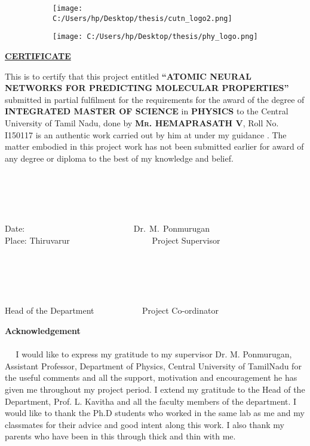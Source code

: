 \documentclass[11pt,a4paper]{report}
\begin{document}
\pagebreak
\begin{center}
	\begin{figure} [H]
		\begin{subfigure}{0.5\textwidth}
		\centering
		\texttt{[image: C:/Users/hp/Desktop/thesis/cutn\_logo2.png]}
		\end{subfigure}%
		\begin{subfigure}{0.8\textwidth}
		\centering
		\texttt{[image: C:/Users/hp/Desktop/thesis/phy\_logo.png]}
		\end{subfigure}
	\end{figure}

\underline {\scshape\bfseries\large CERTIFICATE}
\end{center}
\large {This is to certify that this project entitled {\bfseries \normalsize``ATOMIC NEURAL NETWORKS FOR PREDICTING MOLECULAR PROPERTIES''} submitted in partial fulfilment for the requirements for the award of the degree of {\normalsize\bfseries \scshape INTEGRATED MASTER OF  SCIENCE  } in {\normalsize\bfseries \scshape PHYSICS} to the Central University of Tamil Nadu, done by 
 {\normalsize\bfseries \scshape Mr. HEMAPRASATH V}, Roll No. I150117 is an authentic work carried out by him at  under my guidance . The matter embodied in this project work has not been submitted earlier for award of any degree or diploma to the best of my knowledge and belief.
 \\
 \\\\\\\\\\
 Date: $~~~~~~~~~~~~~~~~~~~~~~~~~~~~~~~~~~~~~~~~~~~~~~~~~~~~~~~~$ Dr.$~~$M.$~~$Ponmurugan
 \\
 Place: Thiruvarur $~~~~~~~~~~~~~~~~~~~~~~~~~~~~~~~~~~~~~~~~~~~$Project Supervisor
 \\
 \\
 \\\\\\\\
 Head of the Department $~~~~~~~~~~~~~~~~~~~~~~~$ Project Co-ordinator
\pagebreak


{\onehalfspacing
		
	{\centering \bfseries \LARGE Acknowledgement}
\\\\	
$~~~~~~$I would like to express my gratitude to my supervisor \linebreak
Dr. M. Ponmurugan, Assistant Professor, Department of Physics, Central University of TamilNadu for the useful comments and all the support, motivation and encouragement he has given me throughout my project period. I extend my gratitude to the Head of the Department, Prof. L. Kavitha and all the faculty members of the department. I would like to thank the Ph.D students who worked in the same lab as me and my classmates for their advice and good intent along this work. I also thank my parents who have been in this through thick and thin with me.}
\pagebreak
	\begin{center}

\end{center}}
\end{document}
